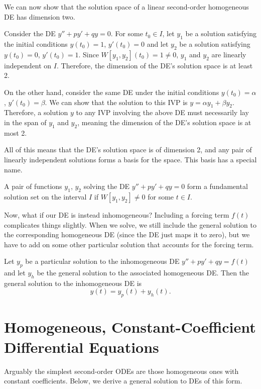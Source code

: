 \documentclass[../m82main.tex]{chapters}
\begin{document}
We can now show that the solution space of a linear second-order homogeneous DE has dimension two.

Consider the DE $y'' + py' + qy = 0$.
For some $t_0 \in I$, let $y_1$ be a solution satisfying the initial conditions $y(t_0) = 1$, $y'(t_0) = 0$ and let $y_2$ be a solution satisfying $y(t_0) = 0$, $y'(t_0) = 1$.
Since $W[y_1, y_2](t_0) = 1 \neq 0$, $y_1$ and $y_2$ are linearly independent on $I$.
Therefore, the dimension of the DE's solution space is at least 2.

On the other hand, consider the same DE under the initial conditions $y(t_0) = \alpha$, $y'(t_0) = \beta$.
We can show that the solution to this IVP is $y = \alpha y_1 + \beta y_2$.
Therefore, a solution $y$ to any IVP involving the above DE must necessarily lay in the span of $y_1$ and $y_2$, meaning the dimension of the DE's solution space is at most 2.

All of this means that the DE's solution space is of dimension 2, and any pair of linearly independent solutions forms a basis for the space.
This basis has a special name.

\begin{definition}
    A pair of functions $y_1$, $y_2$ solving the DE $y'' + py' + qy = 0$ form a fundamental solution set on the interval $I$ if $W[y_1, y_2] \neq 0$ for some $t \in I$.
\end{definition}

Now, what if our DE is instead inhomogeneous?
Including a forcing term $f(t)$ complicates things slightly.
When we solve, we still include the general solution to the corresponding homogeneous DE (since the DE just maps it to zero), but we have to add on some other particular solution that accounts for the forcing term.

\begin{theorem}
    Let $y_p$ be a particular solution to the inhomogeneous DE $y'' + py' + qy = f(t)$ and let $y_h$ be the general solution to the associated homogeneous DE.
    Then the general solution to the inhomogeneous DE is
    \[ y(t) = y_p(t) + y_h(t). \]
\end{theorem}

\section{Homogeneous, Constant-Coefficient Differential Equations}
Arguably the simplest second-order ODEs are those homogeneous ones with constant coefficients.
Below, we derive a general solution to DEs of this form.
\end{document}
